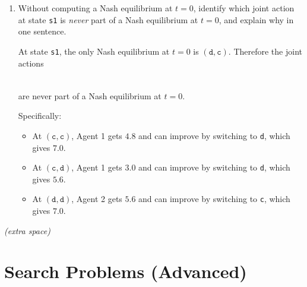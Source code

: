 \begin{enumerate}
\begin{solution}
\[
q_1^*(\texttt{s1},\texttt{c,c};0)=3+0.8(1)+0.2(5)=4.8,
\]
\[
q_1^*(\texttt{s1},\texttt{c,d};0)=0+0.5(1)+0.5(5)=3.0,
\]
\[
q_1^*(\texttt{s1},\texttt{d,c};0)=4+0.5(1)+0.5(5)=7.0,
\]
\[
q_1^*(\texttt{s1},\texttt{d,d};0)=1+0.1(1)+0.9(5)=5.6,
\]

\[
q_1^*(\texttt{s2},\texttt{c,c};0)=5+0.3(1)+0.7(5)=8.8,
\]
\[
q_1^*(\texttt{s2},\texttt{c,d};0)=1+0.6(1)+0.4(5)=3.6,
\]
\[
q_1^*(\texttt{s2},\texttt{d,c};0)=1+0.6(1)+0.4(5)=3.6,
\]
\[
q_1^*(\texttt{s2},\texttt{d,d};0)=5+0.2(1)+0.8(5)=9.2.
\]

\end{solution}
\clearpage
\item \points[2]
Without computing a Nash equilibrium at $t=0$, identify which joint action at state
\texttt{s1} is \emph{never} part of a Nash equilibrium at $t=0$, and explain why in one
sentence.
\begin{solution}
At state \texttt{s1}, the only Nash equilibrium at $t=0$ is $(\texttt{d},\texttt{c})$. Therefore the joint actions
\[
\ansnt{(\texttt{c},\texttt{c}),\;(\texttt{c},\texttt{d}),\;\text{and}\;(\texttt{d},\texttt{d})}
\]
are never part of a Nash equilibrium at $t=0$.

Specifically:
\begin{itemize}
  \item At $(\texttt{c},\texttt{c})$, Agent 1 gets $4.8$ and can improve by switching to \texttt{d}, which gives $7.0$.
  \item At $(\texttt{c},\texttt{d})$, Agent 1 gets $3.0$ and can improve by switching to \texttt{d}, which gives $5.6$.
  \item At $(\texttt{d},\texttt{d})$, Agent 2 gets $5.6$ and can improve by switching to \texttt{c}, which gives $7.0$.
\end{itemize}
\end{solution}
\vspace{60pt}

\end{enumerate}

\clearpage

\begin{center}
    \textit{(extra space)}
\end{center}

\clearpage

\section{\points[10] Search Problems (Advanced)}
